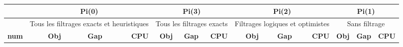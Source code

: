 \begin{table}[H]
	\centering
	\small
	\begin{tabular}{|r|rrr|rrr|rrr|rrr|}
		\toprule
		\hline
		\rowcolor{cyan}	& \multicolumn{3}{c|}{\textbf{Pi(0)}}&\multicolumn{3}{c|}{\textbf{Pi(3)}}&\multicolumn{3}{c|}{\textbf{Pi(2)}}&\multicolumn{3}{c|}{\textbf{Pi(1)}} \\ \hline
		\midrule
		
		\hline
		\rowcolor{cyan}	&\multicolumn{3}{c|}{ \tiny{Tous les filtrages exacts et heuristiques}} & \multicolumn{3}{c|}{\tiny{Tous les filtrages exacts}}&\multicolumn{3}{c|}{\tiny{Filtrages logiques et optimistes}}&\multicolumn{3}{c|}{\tiny{Sans filtrage}}
		\\ \hline
		\midrule
		
		\rowcolor{cyan}	\textbf{num} & \textbf{Obj}& \textbf{Gap}  & \textbf{CPU} & \textbf{Obj}& \textbf{Gap}  & \textbf{CPU} & \textbf{Obj}& \textbf{Gap}  & \textbf{CPU} & \textbf{Obj}&\textbf{Gap}  & \textbf{CPU} \\ \hline
		\midrule
		

\end{tabular}
\end{table}
